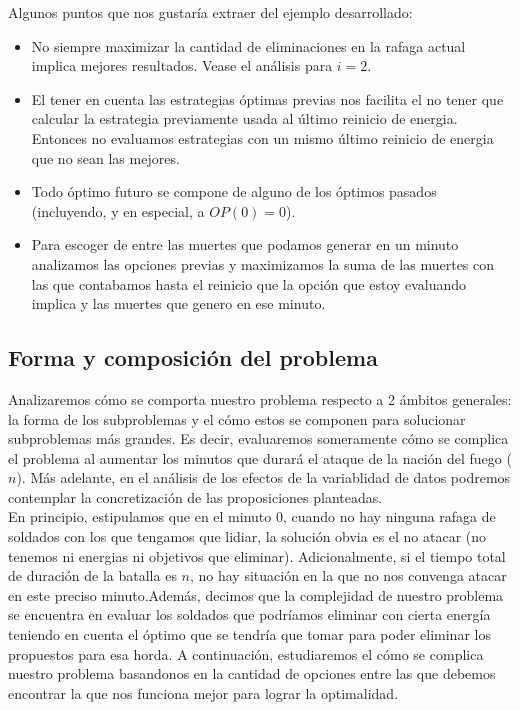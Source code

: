 Algunos puntos que nos gustaría extraer del ejemplo desarrollado:
\begin{itemize}
    \item{No siempre maximizar la cantidad de eliminaciones en la rafaga actual implica mejores resultados. Vease el análisis para $i=2$.}
    \item{El tener en cuenta las estrategias óptimas previas nos facilita el no tener que calcular la estrategia previamente usada al último reinicio de energia. Entonces no evaluamos estrategias con un mismo último reinicio de energia que no sean las mejores.}
    \item{Todo óptimo futuro se compone de alguno de los óptimos pasados (incluyendo, y en especial, a  $OP(0)=0$).}
    \item{Para escoger de entre las muertes que podamos generar en un minuto analizamos las opciones previas y maximizamos la suma de las muertes con las que contabamos hasta el reinicio que la opción que estoy evaluando implica y las muertes que genero en ese minuto.}


\end{itemize}


\subsection{Forma y composición del problema} Analizaremos cómo se comporta nuestro problema respecto a 2 ámbitos generales: la forma de los subproblemas y el cómo estos se componen para solucionar subproblemas más grandes. Es decir, evaluaremos someramente cómo se complica el problema al aumentar los minutos que durará el ataque de la nación del fuego ($n$). Más adelante, en el análisis de los efectos de la variablidad de datos podremos contemplar la concretización de las proposiciones planteadas.\\

En principio, estipulamos que en el minuto 0, cuando no hay ninguna rafaga de soldados con los que tengamos que lidiar, la solución obvia es el no atacar (no tenemos ni energias ni objetivos que eliminar). Adicionalmente, si el tiempo total de duración de la batalla es $n$, no hay situación en la que no nos convenga atacar en este preciso minuto.Además, decimos que la complejidad de nuestro problema se encuentra en evaluar los soldados que podríamos eliminar con cierta energía teniendo en cuenta el óptimo que se tendría que tomar para poder eliminar los propuestos para esa horda. A continuación, estudiaremos el cómo se complica nuestro problema basandonos en la cantidad de opciones entre las que debemos encontrar la que nos funciona mejor para lograr la optimalidad.

